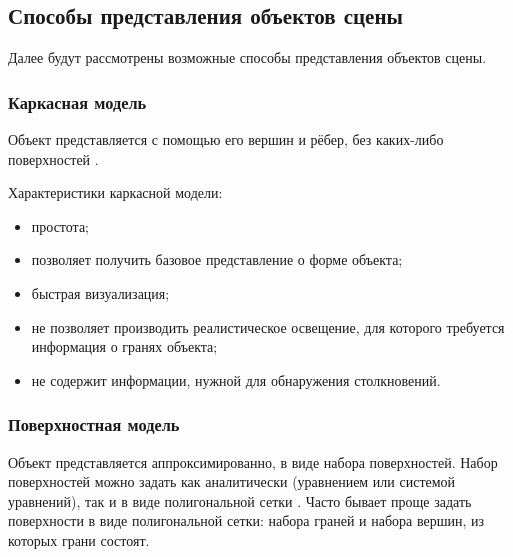 \subsection{Способы представления объектов сцены}

Далее будут рассмотрены возможные способы представления объектов сцены.

\subsubsection{Каркасная модель}

Объект представляется с помощью его вершин и рёбер, без каких-либо поверхностей \cite{m3m}.

Характеристики каркасной модели:
\begin{itemize}
    \item простота;
    \item позволяет получить базовое представление о форме объекта;
    \item быстрая визуализация;
    \item не позволяет производить реалистическое освещение, для которого требуется информация о гранях объекта;
    \item не содержит информации, нужной для обнаружения столкновений.
\end{itemize}


\subsubsection{Поверхностная модель}

Объект представляется аппроксимированно, в виде набора поверхностей.
Набор поверхностей можно задать как аналитически (уравнением или системой уравнений), так и в виде полигональной сетки \cite{m3m}.
Часто бывает проще задать поверхности в виде полигональной сетки: набора граней и набора вершин, из которых грани состоят.

